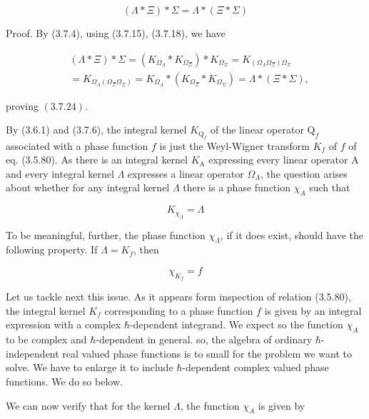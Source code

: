 \documentclass{article}
\begin{document}
\begin{equation*}
(\Lambda * \Xi) * \Sigma=\Lambda *(\Xi * \Sigma) \tag{3.7.24}
\end{equation*}
 

Proof. By (3.7.4), using (3.7.15), (3.7.18), we have
 
\begin{align*}
& (\Lambda * \Xi) * \Sigma=\left(K_{\Omega_{\Lambda}} * K_{\Omega_{\Xi}}\right) * K_{\Omega_{\Sigma}}=K_{\left(\Omega_{\Lambda} \Omega_{\Xi}\right) \Omega_{\Sigma}}  \tag{3.7.25}\\
& =K_{\Omega_{\Lambda}\left(\Omega_{\Xi} \Omega_{\Sigma}\right)}=K_{\Omega_{\Lambda}} *\left(K_{\Omega_{\Xi}} * K_{\Omega_{\Sigma}}\right)=\Lambda *(\Xi * \Sigma),
\end{align*}
 
proving $(3.7 .24)$.

By (3.6.1) and (3.7.6), the integral kernel $K_{\mathrm{Q}_{f}}$ of the linear operator $\mathrm{Q}_{f}$ associated with a phase function $f$ is just the Weyl-Wigner transform $K_{f}$ of $f$ of eq. (3.5.80). As there is an integral kernel $K_{\mathrm{A}}$ expressing every linear operator A and every integral kernel $\Lambda$ expresses a linear operator $\Omega_{\Lambda}$, the question arises about whether for any integral kernel $\Lambda$ there is a phase function $\chi_{A}$ such that
 
\begin{equation*}
K_{\chi_{\Lambda}}=\Lambda \tag{3.7.26}
\end{equation*}
 

To be meaningful, further, the phase function $\chi_{\Lambda}$, if it does exist, should have the following property. If $\Lambda=K_{f}$, then
 
\begin{equation*}
\chi_{K_{f}}=f \tag{3.7.27}
\end{equation*}
 

Let us tackle next this issue.
As it appears form inspection of relation (3.5.80), the integral kernel $K_{f}$ corresponding to a phase function $f$ is given by an integral expression with a complex $\hbar$-dependent integrand. We expect so the function $\chi_{A}$ to be complex and $\hbar$-dependent in general. so, the algebra of ordinary $\hbar$-independent real valued
phase functions is to small for the problem we want to solve. We have to enlarge it to include $\hbar$-dependent complex valued phase functions. We do so below.

We can now verify that for the kernel $\Lambda$, the function $\chi_{A}$ is given by
 
\end{document}
